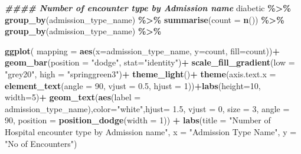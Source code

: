 \documentclass[
]{article}
\newenvironment{Shaded}{\begin{snugshade}}{\end{snugshade}}
\newcommand{\AttributeTok}[1]{\textcolor[rgb]{0.13,0.29,0.53}{#1}}
\newcommand{\DecValTok}[1]{\textcolor[rgb]{0.00,0.00,0.81}{#1}}
\newcommand{\DocumentationTok}[1]{\textcolor[rgb]{0.56,0.35,0.01}{\textbf{\textit{#1}}}}
\newcommand{\FloatTok}[1]{\textcolor[rgb]{0.00,0.00,0.81}{#1}}
\newcommand{\FunctionTok}[1]{\textcolor[rgb]{0.13,0.29,0.53}{\textbf{#1}}}
\newcommand{\NormalTok}[1]{#1}
\newcommand{\SpecialCharTok}[1]{\textcolor[rgb]{0.81,0.36,0.00}{\textbf{#1}}}
\newcommand{\StringTok}[1]{\textcolor[rgb]{0.31,0.60,0.02}{#1}}
\begin{document}
\begin{Shaded}
\begin{Highlighting}[]
\DocumentationTok{\#\#\#\# Number of encounter type by Admission name }
\NormalTok{diabetic }\SpecialCharTok{\%\textgreater{}\%}  \FunctionTok{group\_by}\NormalTok{(admission\_type\_name) }\SpecialCharTok{\%\textgreater{}\%} \FunctionTok{summarise}\NormalTok{(}\AttributeTok{count =} \FunctionTok{n}\NormalTok{()) }\SpecialCharTok{\%\textgreater{}\%} \FunctionTok{group\_by}\NormalTok{(admission\_type\_name) }\SpecialCharTok{\%\textgreater{}\%}
  
  \FunctionTok{ggplot}\NormalTok{( }\AttributeTok{mapping =} \FunctionTok{aes}\NormalTok{(}\AttributeTok{x=}\NormalTok{admission\_type\_name, }\AttributeTok{y=}\NormalTok{count, }\AttributeTok{fill=}\NormalTok{count))}\SpecialCharTok{+} 
  \FunctionTok{geom\_bar}\NormalTok{(}\AttributeTok{position =} \StringTok{"dodge"}\NormalTok{, }\AttributeTok{stat=}\StringTok{"identity"}\NormalTok{)}\SpecialCharTok{+}
  \FunctionTok{scale\_fill\_gradient}\NormalTok{(}\AttributeTok{low =} \StringTok{"grey20"}\NormalTok{, }\AttributeTok{high =} \StringTok{"springgreen3"}\NormalTok{)}\SpecialCharTok{+}
  \FunctionTok{theme\_light}\NormalTok{()}\SpecialCharTok{+}
  \FunctionTok{theme}\NormalTok{(}\AttributeTok{axis.text.x =} \FunctionTok{element\_text}\NormalTok{(}\AttributeTok{angle =} \DecValTok{90}\NormalTok{, }\AttributeTok{vjust =} \FloatTok{0.5}\NormalTok{, }\AttributeTok{hjust =} \DecValTok{1}\NormalTok{))}\SpecialCharTok{+}\FunctionTok{labs}\NormalTok{(}\AttributeTok{height=}\DecValTok{10}\NormalTok{, }\AttributeTok{width=}\DecValTok{5}\NormalTok{)}\SpecialCharTok{+}
  \FunctionTok{geom\_text}\NormalTok{(}\FunctionTok{aes}\NormalTok{(}\AttributeTok{label =}\NormalTok{ admission\_type\_name),}\AttributeTok{color=}\StringTok{"white"}\NormalTok{,}\AttributeTok{hjust=} \FloatTok{1.5}\NormalTok{, }\AttributeTok{vjust =} \DecValTok{0}\NormalTok{, }\AttributeTok{size =} \DecValTok{3}\NormalTok{, }\AttributeTok{angle =} \DecValTok{90}\NormalTok{, }\AttributeTok{position =} \FunctionTok{position\_dodge}\NormalTok{(}\AttributeTok{width =} \DecValTok{1}\NormalTok{)) }\SpecialCharTok{+} \FunctionTok{labs}\NormalTok{(}\AttributeTok{title =} \StringTok{"Number of Hospital encounter type by Admission name"}\NormalTok{, }\AttributeTok{x =} \StringTok{"Admission Type Name"}\NormalTok{, }\AttributeTok{y =} \StringTok{"No of Encounters"}\NormalTok{)}
\end{Highlighting}
\end{Shaded}
\end{document}
